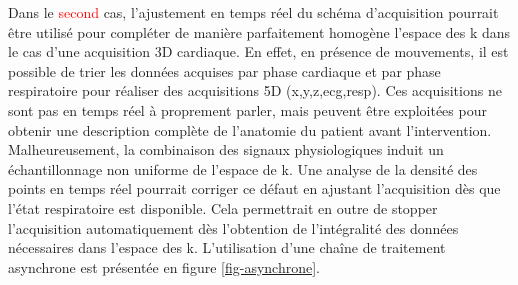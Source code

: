
Dans le \textcolor{red}{second} cas, l’ajustement en temps réel du schéma d’acquisition pourrait être utilisé pour compléter de manière parfaitement homogène l’espace des k dans le cas d’une acquisition 3D cardiaque. En effet, en présence de mouvements, il est possible de trier les données acquises par phase cardiaque et par phase respiratoire pour réaliser des acquisitions 5D (x,y,z,ecg,resp). Ces acquisitions ne sont pas en temps réel à proprement parler, mais peuvent être exploitées pour obtenir une description complète de l’anatomie du patient avant l’intervention. Malheureusement, la combinaison des signaux physiologiques induit un échantillonnage non uniforme de l’espace de k. Une analyse de la densité des points en temps réel pourrait corriger ce défaut en ajustant l’acquisition dès que l’état respiratoire est disponible. Cela permettrait en outre de stopper l’acquisition automatiquement dès l’obtention de l’intégralité des données nécessaires dans l’espace des k. L’utilisation d’une chaîne de traitement asynchrone est présentée en figure \ref{fig-asynchrone}.\\